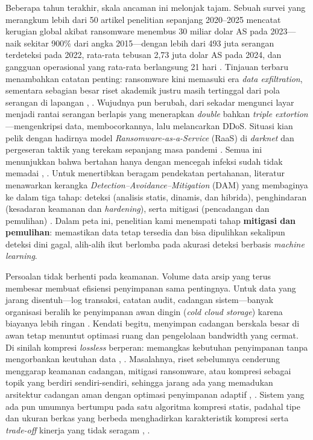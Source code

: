 \documentclass{iaesarticle}
\begin{document}
Beberapa tahun terakhir, skala ancaman ini melonjak tajam. Sebuah survei yang merangkum lebih dari 50 artikel penelitian sepanjang 2020--2025 mencatat kerugian global akibat ransomware menembus 30 miliar dolar AS pada 2023---naik sekitar 900\% dari angka 2015---dengan lebih dari 493 juta serangan terdeteksi pada 2022, rata-rata tebusan 2,73 juta dolar AS pada 2024, dan gangguan operasional yang rata-rata berlangsung 21 hari \cite{41}. Tinjauan terbaru menambahkan catatan penting: ransomware kini memasuki era \textit{data exfiltration}, sementara sebagian besar riset akademik justru masih tertinggal dari pola serangan di lapangan \cite{23}, \cite{26}. Wujudnya pun berubah, dari sekadar mengunci layar menjadi rantai serangan berlapis yang menerapkan \textit{double} bahkan \textit{triple extortion}---mengenkripsi data, membocorkannya, lalu melancarkan DDoS. Situasi kian pelik dengan hadirnya model \textit{Ransomware-as-a-Service} (RaaS) di \textit{darknet} \cite{40} dan pergeseran taktik yang terekam sepanjang masa pandemi \cite{33}. Semua ini menunjukkan bahwa bertahan hanya dengan mencegah infeksi sudah tidak memadai \cite{42}, \cite{46}. Untuk menertibkan beragam pendekatan pertahanan, literatur menawarkan kerangka \textit{Detection--Avoidance--Mitigation} (DAM) yang membaginya ke dalam tiga tahap: deteksi (analisis statis, dinamis, dan hibrida), penghindaran (kesadaran keamanan dan \textit{hardening}), serta mitigasi (pencadangan dan pemulihan) \cite{42}. Dalam peta ini, penelitian kami menempati tahap \textbf{mitigasi dan pemulihan}: memastikan data tetap tersedia dan bisa dipulihkan sekalipun deteksi dini gagal, alih-alih ikut berlomba pada akurasi deteksi berbasis \textit{machine learning}.

Persoalan tidak berhenti pada keamanan. Volume data arsip yang terus membesar membuat efisiensi penyimpanan sama pentingnya. Untuk data yang jarang disentuh---log transaksi, catatan audit, cadangan sistem---banyak organisasi beralih ke penyimpanan awan dingin (\textit{cold cloud storage}) karena biayanya lebih ringan \cite{11}. Kendati begitu, menyimpan cadangan berskala besar di awan tetap menuntut optimasi ruang dan pengelolaan bandwidth yang cermat. Di sinilah kompresi \textit{lossless} berperan: memangkas kebutuhan penyimpanan tanpa mengorbankan keutuhan data \cite{12}, \cite{13}. Masalahnya, riset sebelumnya cenderung menggarap keamanan cadangan, mitigasi ransomware, atau kompresi sebagai topik yang berdiri sendiri-sendiri, sehingga jarang ada yang memadukan arsitektur cadangan aman dengan optimasi penyimpanan adaptif \cite{14}, \cite{15}. Sistem yang ada pun umumnya bertumpu pada satu algoritma kompresi statis, padahal tipe dan ukuran berkas yang berbeda menghadirkan karakteristik kompresi serta \textit{trade-off} kinerja yang tidak seragam \cite{16}, \cite{17}.
\end{document}
